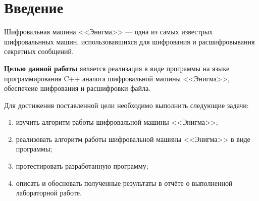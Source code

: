 \chapter*{Введение}

Шифровальная машина <<Энигма>> --- одна из самых известрых шифровальнных машин, использовавшихся для шифрования и расшифровывания секретных сообщений.

\textbf{Целью данной работы} является реализация в виде программы на языке программирования C++ аналога шифровальной машины <<Энигма>>, обеспечеие шифрования и расшифровки файла. 

Для достижения поставленной цели необходимо выполнить следующие задачи:
\begin{enumerate}[label=\arabic*)]
	\item изучить алгоритм работы шифровальной машины <<Энигма>>;
    \item реализовать алгоритм работы шифровальной машины <<Энигма>> в виде программы;
	\item протестировать разработанную программу;
	\item описать и обосновать полученные результаты в отчёте о выполненной лабораторной работе.
\end{enumerate}